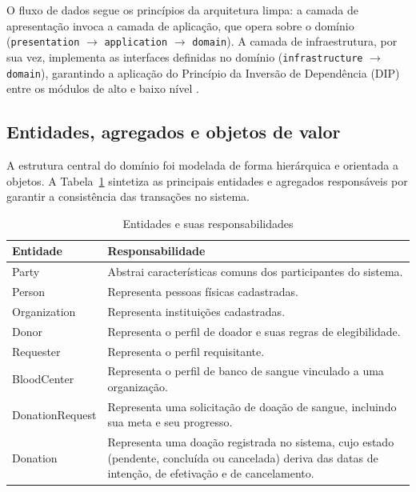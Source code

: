 O fluxo de dados segue os princípios da arquitetura limpa: a camada de apresentação invoca a camada de aplicação, que opera sobre o domínio (\texttt{presentation} $\rightarrow$ \texttt{application} $\rightarrow$ \texttt{domain}). A camada de infraestrutura, por sua vez, implementa as interfaces definidas no domínio (\texttt{infrastructure} $\rightarrow$ \texttt{domain}), garantindo a aplicação do Princípio da Inversão de Dependência (DIP) entre os módulos de alto e baixo nível \cite{martin2008}.

\subsection{Entidades, agregados e objetos de valor}

A estrutura central do domínio foi modelada de forma hierárquica e orientada a objetos. A Tabela~\ref{tab:entidades} sintetiza as principais entidades e agregados responsáveis por garantir a consistência das transações no sistema.

\begin{table}[H]
  \centering
  \caption{Entidades e suas responsabilidades}
  \label{tab:entidades}
  \begin{tabularx}{\textwidth}{>{\raggedright\arraybackslash}p{4cm} X}
    \toprule
    \textbf{Entidade} & \textbf{Responsabilidade} \\
    \midrule
    Party & Abstrai características comuns dos participantes do sistema. \\
    Person & Representa pessoas físicas cadastradas. \\
    Organization & Representa instituições cadastradas. \\
    Donor & Representa o perfil de doador e suas regras de elegibilidade. \\
    Requester & Representa o perfil requisitante. \\
    BloodCenter & Representa o perfil de banco de sangue vinculado a uma organização. \\
    DonationRequest & Representa uma solicitação de doação de sangue, incluindo sua meta e seu progresso. \\
    Donation & Representa uma doação registrada no sistema, cujo estado (pendente, concluída ou cancelada) deriva das datas de intenção, de efetivação e de cancelamento. \\
    \bottomrule
  \end{tabularx}
\end{table}

